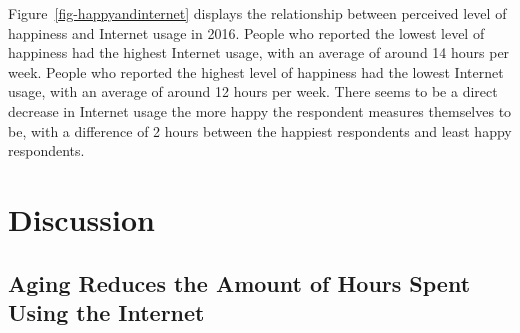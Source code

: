 \documentclass[
]{article}
\begin{document}
Figure~\ref{fig-happyandinternet} displays the relationship between
perceived level of happiness and Internet usage in 2016. People who
reported the lowest level of happiness had the highest Internet usage,
with an average of around 14 hours per week. People who reported the
highest level of happiness had the lowest Internet usage, with an
average of around 12 hours per week. There seems to be a direct decrease
in Internet usage the more happy the respondent measures themselves to
be, with a difference of 2 hours between the happiest respondents and
least happy respondents.

\hypertarget{sec-discussion}{%
\section{Discussion}\label{sec-discussion}}

\hypertarget{sec-first-point}{%
\subsection{Aging Reduces the Amount of Hours Spent Using the
Internet}\label{sec-first-point}}
\end{document}
